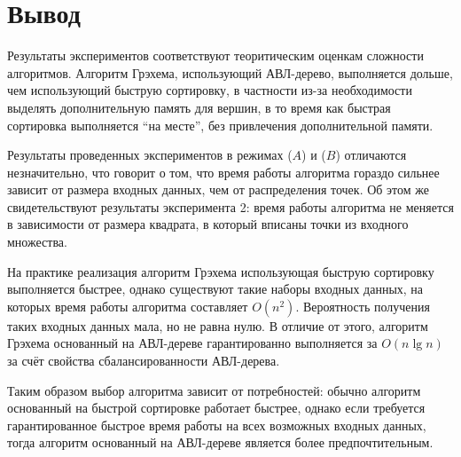 \section{Вывод}
Результаты экспериментов соответствуют теоритическим оценкам сложности алгоритмов. Алгоритм Грэхема, использующий АВЛ-дерево, выполняется дольше, чем использующий быструю сортировку, в частности из-за необходимости выделять дополнительную память для вершин, в то время как быстрая сортировка выполняется \textquotedblleft{}на месте\textquotedblright{}, без привлечения дополнительной памяти. 

Результаты проведенных экспериментов в режимах ($A$) и ($B$) отличаются незначительно, что говорит о том, что время работы алгоритма гораздо сильнее зависит от размера входных данных, чем от распределения точек.
Об этом же свидетельствуют результаты эксперимента 2: время работы алгоритма не меняется в зависимости от размера квадрата, в который вписаны точки из входного множества.

На практике реализация алгоритм Грэхема использующая быструю сортировку выполняется быстрее, однако существуют такие наборы входных данных, на которых время работы алгоритма составляет $O(n^2)$. Вероятность получения таких входных данных мала, но не равна нулю. В отличие от этого, алгоритм Грэхема основанный на АВЛ-дереве гарантированно выполняется за $O(n\lg n)$ за счёт свойства сбалансированности АВЛ-дерева.

Таким образом выбор алгоритма зависит от потребностей: обычно алгоритм основанный на быстрой сортировке работает быстрее, однако если требуется гарантированное быстрое время работы на всех возможных входных данных, тогда алгоритм основанный на АВЛ-дереве является более предпочтительным.

\newpage
